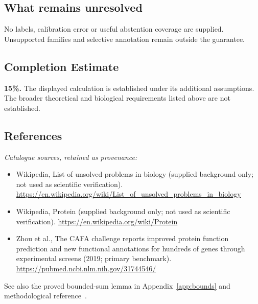 \documentclass[11pt]{article}
\begin{document}
\subsection{What remains unresolved}
No labels, calibration error or useful abstention coverage are supplied. Unsupported families and selective annotation remain outside the guarantee.
\subsection{Completion Estimate}
\textbf{15\%.} The displayed calculation is established under its additional assumptions. The broader theoretical and biological requirements listed above are not established.
\subsection{References}
\noindent\emph{Catalogue sources, retained as provenance:}
\begin{itemize}
\item Wikipedia, List of unsolved problems in biology (supplied background only; not used as scientific verification). \url{https://en.wikipedia.org/wiki/List_of_unsolved_problems_in_biology}
\item Wikipedia, Protein (supplied background only; not used as scientific verification). \url{https://en.wikipedia.org/wiki/Protein}
\item Zhou et al., The CAFA challenge reports improved protein function prediction and new functional annotations for hundreds of genes through experimental screens (2019; primary benchmark). \url{https://pubmed.ncbi.nlm.nih.gov/31744546/}
\end{itemize}
\noindent See also the proved bounded-sum lemma in Appendix~\ref{app:bounds} and methodological reference~\cite{hoeffding}.
\clearpage


\appendix
\end{document}
